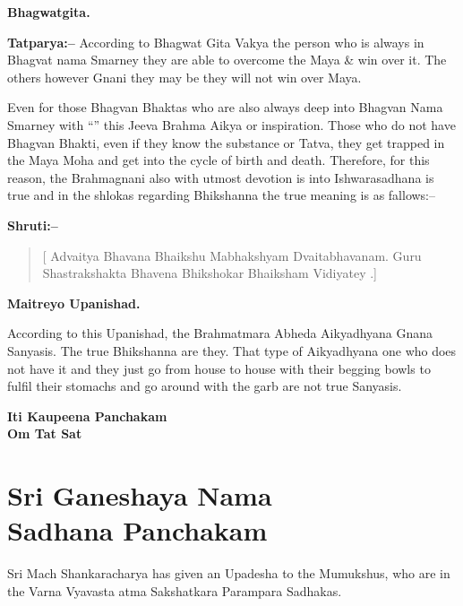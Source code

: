 \begin{flushright}
\textbf{Bhagwatgita.}
\end{flushright}

\textbf{Tatparya:–} According to Bhagwat Gita Vakya the person who is always in Bhagvat nama Smarney they are able to overcome the Maya \& win over it. The others however Gnani they may be they will not win over Maya.

\vskip 6pt

Even for those Bhagvan Bhaktas who are also always deep into Bhagvan Nama Smarney with “” this Jeeva Brahma Aikya or inspiration. Those who do not have Bhagvan Bhakti, even if they know the substance or Tatva, they get trapped in the Maya Moha and get into the cycle of birth and death. Therefore, for this reason, the Brahmagnani also with utmost devotion is into Ishwarasadhana is true and in the shlokas regarding Bhikshanna the true meaning is as fallows:–

\vskip 8pt

\textbf{Shruti:–}

\begin{verse}
[ Advaitya Bhavana Bhaikshu Mabhakshyam Dvaita\break bhavanam.  Guru Shastrakshakta Bhavena Bhiksho\break kar Bhaiksham Vidiyatey .]
\end{verse}

\begin{flushright}
\textbf{Maitreyo Upanishad.}
\end{flushright}

\vskip 3pt

According to this Upanishad, the Brahmatmara Abheda Aikyadhyana Gnana Sanyasis. The true Bhikshanna are they. That type of Aikyadhyana one who does not have it and they just go from house to house with their begging bowls to fulfil their stomachs and go around with the garb are not true Sanyasis.

\begin{center}
\textbf{Iti Kaupeena Panchakam\\ Om Tat Sat}
\end{center}

\chapter[Sri Ganeshaya Nama Sadhana Panchakam]{Sri Ganeshaya Nama\\ Sadhana Panchakam}

Sri Mach Shankaracharya has given an Upadesha to the Mumukshus, who are in the Varna Vyavasta atma Sakshatkara Parampara Sadhakas.

